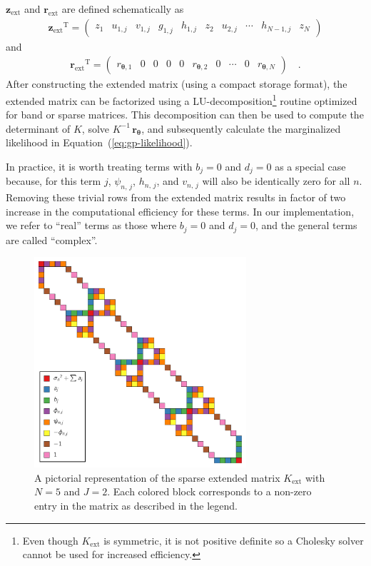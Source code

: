 \documentclass[manuscript, letterpaper]{aastex6}
\newcommand{\figurelabel}[1]{\label{fig:#1}}
\renewcommand{\eqref}[1]{\ref{eq:#1}}
\newcommand{\Eq}[1]{Equation~(\eqref{#1})}
\newcommand{\eq}[1]{\Eq{#1}}
\newcommand{\T}{\ensuremath{\mathrm{T}}}
\newcommand{\bvec}[1]{{\ensuremath{\boldsymbol{#1}}}}
\begin{document}
$\bvec{z}_\mathrm{ext}$ and $\bvec{r}_\mathrm{ext}$ are defined schematically
as
\begin{eqnarray}
{\bvec{z}_\mathrm{ext}} ^\T =
\left(\begin{array}{cccccccccc}
    z_1 & u_{1,j} & v_{1,j} & g_{1,j} & h_{1,j} & z_2 & u_{2,j} & \cdots &
    h_{N-1,j} & z_N
\end{array}\right)
\end{eqnarray}
and
\begin{eqnarray}
{\bvec{r}_\mathrm{ext}} ^\T =
\left(\begin{array}{cccccccccc}
    r_{\bvec{\theta},1} & 0 & 0 & 0 & 0 & r_{\bvec{\theta},2} &
    0 & \cdots & 0 & r_{\bvec{\theta},N}
\end{array}\right) \quad.
\end{eqnarray}
After constructing the extended matrix (using a compact storage format), the
extended matrix can be factorized using a LU-decomposition\footnote{Even
though $K_\mathrm{ext}$ is symmetric, it is not positive definite so a
Cholesky solver cannot be used for increased efficiency.} routine optimized
for band or sparse matrices.
This decomposition can then be used to compute the determinant of $K$, solve
$K^{-1}\,\bvec{r}_\bvec{\theta}$, and subsequently calculate the marginalized
likelihood in \eq{gp-likelihood}.

In practice, it is worth treating terms with $b_j=0$ and $d_j=0$ as a special
case because, for this term $j$, $\psi_{n,\,j}$, $h_{n,\,j}$, and $v_{n,\,j}$
will also be identically zero for all $n$.
Removing these trivial rows from the extended matrix results in factor of two
increase in the computational efficiency for these terms.
In our implementation, we refer to ``real'' terms as those where $b_j=0$ and
$d_j=0$, and the general terms are called ``complex''.

\begin{figure}[tp]
\begin{center}
\includegraphics[width=0.7\textwidth]{figures/matrix.pdf}
\caption{A pictorial representation of the sparse extended matrix
$K_\mathrm{ext}$ with $N=5$ and $J=2$.
Each colored block corresponds to a non-zero entry in the matrix as described
in the legend.
    \figurelabel{matrix}}
\end{center}
\end{figure}
\end{document}
